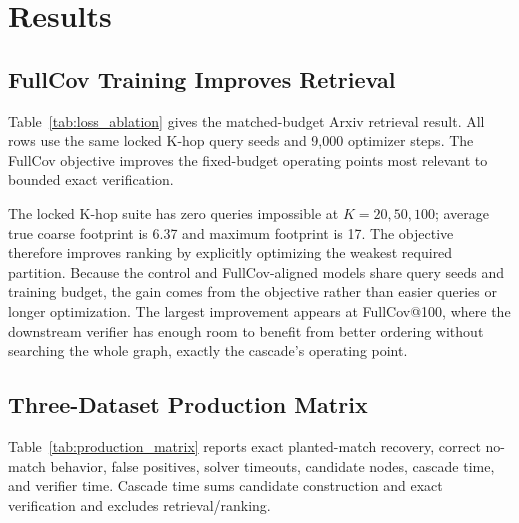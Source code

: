 \documentclass[runningheads]{llncs}
\begin{document}
\section{Results}

\subsection{FullCov Training Improves Retrieval}

Table~\ref{tab:loss_ablation} gives the matched-budget Arxiv retrieval result. All rows use the same locked K-hop query seeds and 9,000 optimizer steps. The FullCov objective improves the fixed-budget operating points most relevant to bounded exact verification.

\begin{table}[H]
\centering
\caption{\textbf{Matched Arxiv retrieval objective ablation.} Fixed retrieval budgets on $n{=}400$ locked K-hop queries (200 per query seed); each row averages the validation-selected checkpoint from two independent training replicates.}
\label{tab:loss_ablation}
\small
\setlength{\tabcolsep}{5pt}
\end{table}

The locked K-hop suite has zero queries impossible at $K=20,50,100$; average true coarse footprint is 6.37 and maximum footprint is 17. The objective therefore improves ranking by explicitly optimizing the weakest required partition. Because the control and FullCov-aligned models share query seeds and training budget, the gain comes from the objective rather than easier queries or longer optimization. The largest improvement appears at FullCov@100, where the downstream verifier has enough room to benefit from better ordering without searching the whole graph, exactly the cascade's operating point.

\clearpage
\begin{samepage}
\subsection{Three-Dataset Production Matrix}

Table~\ref{tab:production_matrix} reports exact planted-match recovery, correct no-match behavior, false positives, solver timeouts, candidate nodes, cascade time, and verifier time. Cascade time sums candidate construction and exact verification and excludes retrieval/ranking.
\end{samepage}
\end{document}
